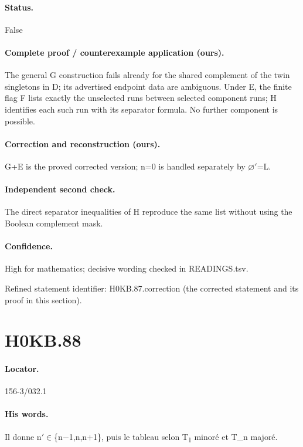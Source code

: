 \paragraph{Status.} False

\paragraph{Complete proof / counterexample application (ours).} The general G construction fails already for the shared complement of the twin singletons in D; its advertised endpoint data are ambiguous. Under E, the finite flag F lists exactly the unselected runs between selected component runs; H identifies each such run with its separator formula. No further component is possible.

\paragraph{Correction and reconstruction (ours).} G+E is the proved corrected version; n=0 is handled separately by \ensuremath{\varnothing}\ensuremath{\prime}=L.

\paragraph{Independent second check.} The direct separator inequalities of H reproduce the same list without using the Boolean complement mask.

\paragraph{Confidence.} High for mathematics; decisive wording checked in READINGS.tsv.

\noindent Refined statement identifier: H0KB.87.correction (the corrected statement and its proof in this section).

\section*{H0KB.88}\label{statement:H0KB.88}
\paragraph{Locator.} 156-3/032.1

\paragraph{His words.} Il donne n\ensuremath{\prime}\ensuremath{\in}\{n\ensuremath{-}1,n,n+1\}, puis le tableau selon T\textsubscript{1} minoré et T\_n majoré.

